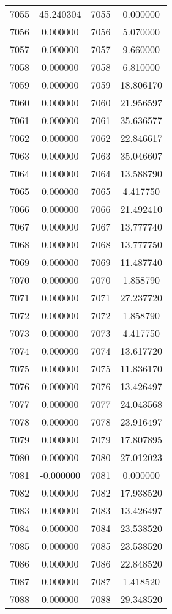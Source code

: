 \documentclass[12pt]{article}
\begin{document}
\begin{longtable}{@{}cccc@{}}
7055 & 45.240304 & 7055 & 0.000000 \\
7056 & 0.000000 & 7056 & 5.070000 \\
7057 & 0.000000 & 7057 & 9.660000 \\
7058 & 0.000000 & 7058 & 6.810000 \\
7059 & 0.000000 & 7059 & 18.806170 \\
7060 & 0.000000 & 7060 & 21.956597 \\
7061 & 0.000000 & 7061 & 35.636577 \\
7062 & 0.000000 & 7062 & 22.846617 \\
7063 & 0.000000 & 7063 & 35.046607 \\
7064 & 0.000000 & 7064 & 13.588790 \\
7065 & 0.000000 & 7065 & 4.417750 \\
7066 & 0.000000 & 7066 & 21.492410 \\
7067 & 0.000000 & 7067 & 13.777740 \\
7068 & 0.000000 & 7068 & 13.777750 \\
7069 & 0.000000 & 7069 & 11.487740 \\
7070 & 0.000000 & 7070 & 1.858790 \\
7071 & 0.000000 & 7071 & 27.237720 \\
7072 & 0.000000 & 7072 & 1.858790 \\
7073 & 0.000000 & 7073 & 4.417750 \\
7074 & 0.000000 & 7074 & 13.617720 \\
7075 & 0.000000 & 7075 & 11.836170 \\
7076 & 0.000000 & 7076 & 13.426497 \\
7077 & 0.000000 & 7077 & 24.043568 \\
7078 & 0.000000 & 7078 & 23.916497 \\
7079 & 0.000000 & 7079 & 17.807895 \\
7080 & 0.000000 & 7080 & 27.012023 \\
7081 & -0.000000 & 7081 & 0.000000 \\
7082 & 0.000000 & 7082 & 17.938520 \\
7083 & 0.000000 & 7083 & 13.426497 \\
7084 & 0.000000 & 7084 & 23.538520 \\
7085 & 0.000000 & 7085 & 23.538520 \\
7086 & 0.000000 & 7086 & 22.848520 \\
7087 & 0.000000 & 7087 & 1.418520 \\
7088 & 0.000000 & 7088 & 29.348520 \\

\end{longtable}
\end{document}
